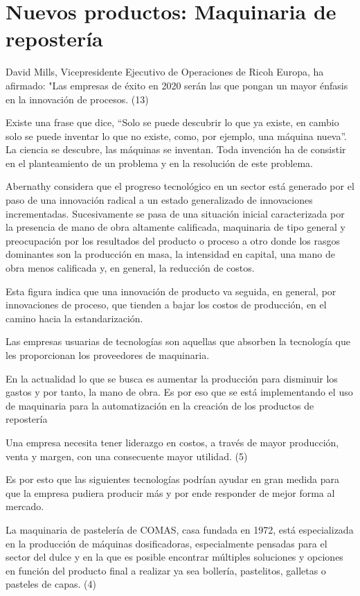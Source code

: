 \documentclass{bmcart}
\begin{document}
\section{Nuevos productos: Maquinaria de repostería}

David Mills, Vicepresidente Ejecutivo de Operaciones de Ricoh Europa, ha afirmado: "Las empresas de éxito en 2020 serán las que pongan un mayor énfasis en la innovación de procesos. (13)

Existe una frase que dice, “Solo se puede descubrir lo que ya existe, en cambio solo se puede inventar lo que no existe, como, por ejemplo, una máquina nueva”. La ciencia se descubre, las máquinas se inventan. Toda invención ha de consistir en el planteamiento de un problema y en la resolución de este problema.

Abernathy considera que el progreso tecnológico en un sector está generado por el paso de una innovación radical a un estado generalizado de innovaciones incrementadas. Sucesivamente se pasa de una situación inicial caracterizada por la presencia de mano de obra altamente calificada, maquinaria de tipo general y preocupación por los resultados del producto o proceso a otro donde los rasgos dominantes son la producción en masa, la intensidad en capital, una mano de obra menos calificada y, en general, la reducción de costos.



Esta figura indica que una innovación de producto va seguida, en general, por innovaciones de proceso, que tienden a bajar los costos de producción, en el camino hacia la estandarización.

Las empresas usuarias de tecnologías son aquellas que absorben la tecnología que les proporcionan los proveedores de maquinaria.

En la actualidad lo que se busca es aumentar la producción para disminuir los gastos y por tanto, la mano de obra. Es por eso que se está implementando el uso de maquinaria para la automatización en la creación de los productos de repostería

Una empresa necesita tener liderazgo en costos, a través de mayor producción, venta y margen, con una consecuente mayor utilidad. (5)

Es por esto que las siguientes tecnologías podrían ayudar en gran medida para que la empresa pudiera producir más y por ende responder de mejor forma al mercado.

La maquinaria de pastelería de COMAS, casa fundada en 1972, está especializada en la producción de máquinas dosificadoras, especialmente pensadas para el sector del dulce y en la que es posible encontrar múltiples soluciones y opciones en función del producto final a realizar ya sea bollería, pastelitos, galletas o pasteles de capas. (4)
\end{document}
